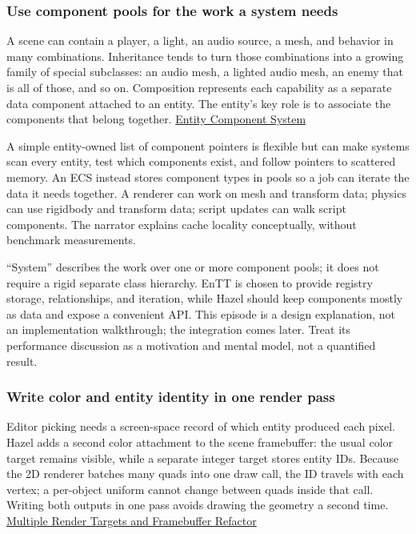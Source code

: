 \subsubsection{Use component pools for the work a system needs}\label{use-component-pools-for-the-work-a-system-needs}

A scene can contain a player, a light, an audio source, a mesh, and behavior in many combinations. Inheritance tends to turn those combinations into a growing family of special subclasses: an audio mesh, a lighted audio mesh, an enemy that is all of those, and so on. Composition represents each capability as a separate data component attached to an entity. The entity's key role is to associate the components that belong together. \href{https://www.youtube.com/watch?v=Z-CILn2w9K0}{Entity Component System}

A simple entity-owned list of component pointers is flexible but can make systems scan every entity, test which components exist, and follow pointers to scattered memory. An ECS instead stores component types in pools so a job can iterate the data it needs together. A renderer can work on mesh and transform data; physics can use rigidbody and transform data; script updates can walk script components. The narrator explains cache locality conceptually, without benchmark measurements.

``System'' describes the work over one or more component pools; it does not require a rigid separate class hierarchy. EnTT is chosen to provide registry storage, relationships, and iteration, while Hazel should keep components mostly as data and expose a convenient API. This episode is a design explanation, not an implementation walkthrough; the integration comes later. Treat its performance discussion as a motivation and mental model, not a quantified result.

\subsubsection{Write color and entity identity in one render pass}\label{write-color-and-entity-identity-in-one-render-pass}

Editor picking needs a screen-space record of which entity produced each pixel. Hazel adds a second color attachment to the scene framebuffer: the usual color target remains visible, while a separate integer target stores entity IDs. Because the 2D renderer batches many quads into one draw call, the ID travels with each vertex; a per-object uniform cannot change between quads inside that call. Writing both outputs in one pass avoids drawing the geometry a second time. \href{https://www.youtube.com/watch?v=f-GbHye1VFQ}{Multiple Render Targets and Framebuffer Refactor}

